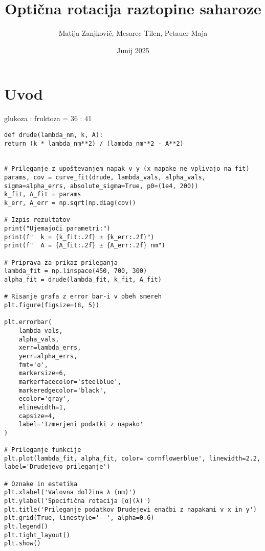 \documentclass[9pt]{extarticle}
\title{Optična rotacija raztopine saharoze}
\author{Matija Zanjkovič, Mesarec Tilen, Petauer Maja}
\date{Junij 2025}
\begin{document}
\maketitle

\section*{Uvod}

glukoza : fruktoza = 36 : 41

\pagebreak

\begin{lstlisting}
def drude(lambda_nm, k, A):
return (k * lambda_nm**2) / (lambda_nm**2 - A**2)


# Prileganje z upoštevanjem napak v y (x napake ne vplivajo na fit)
params, cov = curve_fit(drude, lambda_vals, alpha_vals, sigma=alpha_errs, absolute_sigma=True, p0=(1e4, 200))
k_fit, A_fit = params
k_err, A_err = np.sqrt(np.diag(cov))

# Izpis rezultatov
print("Ujemajoči parametri:")
print(f"  k = {k_fit:.2f} ± {k_err:.2f}")
print(f"  A = {A_fit:.2f} ± {A_err:.2f} nm")

# Priprava za prikaz prileganja
lambda_fit = np.linspace(450, 700, 300)
alpha_fit = drude(lambda_fit, k_fit, A_fit)

# Risanje grafa z error bar-i v obeh smereh
plt.figure(figsize=(8, 5))

plt.errorbar(
    lambda_vals,
    alpha_vals,
    xerr=lambda_errs,
    yerr=alpha_errs,
    fmt='o',
    markersize=6,
    markerfacecolor='steelblue',
    markeredgecolor='black',
    ecolor='gray',
    elinewidth=1,
    capsize=4,
    label='Izmerjeni podatki z napako'
)

# Prileganje funkcije
plt.plot(lambda_fit, alpha_fit, color='cornflowerblue', linewidth=2.2, label='Drudejevo prileganje')

# Oznake in estetika
plt.xlabel('Valovna dolžina λ (nm)')
plt.ylabel('Specifična rotacija [α](λ)')
plt.title('Prileganje podatkov Drudejevi enačbi z napakami v x in y')
plt.grid(True, linestyle='--', alpha=0.6)
plt.legend()
plt.tight_layout()
plt.show()
\end{lstlisting}
\end{document}

